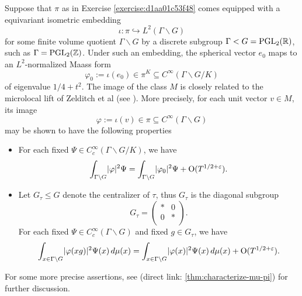 \documentclass[reqno]{amsart} 
\numberwithin{equation}{section}
\begin{document}
\begin{remark}
  Suppose that $\pi$ as in Exercise \ref{exercise:d1aa01c53f48} comes equipped with a equivariant isometric embedding
  \begin{equation*}
    \iota : \pi \hookrightarrow L^2(\Gamma \backslash G)
  \end{equation*}
  for some finite volume quotient $\Gamma \backslash G$ by a discrete subgroup $\Gamma < G = \operatorname{PGL}_2(\mathbb{R})$, such as $\Gamma = \operatorname{PGL}_2(\mathbb{Z})$.  Under such an embedding, the spherical vector $e_0$ maps to an $L^2$-normalized Maass form
  \begin{equation*}
    \varphi_0 := \iota (e_0) \in \pi^K \subseteq C^\infty(\Gamma \backslash G / K)
  \end{equation*}
  of eigenvalue $1/4 + t^2$.  The image of the class $M$ is closely related to the microlocal lift of Zelditch et al (see \cite{MR916129, MR1859345, MR2346281, MR2314452}).  More precisely, for each unit vector $v \in M$, its image
  \begin{equation*}
    \varphi := \iota(v) \in  \pi \subseteq C^\infty(\Gamma \backslash G)
  \end{equation*}
  may be shown to have the following properties
  \begin{itemize}
  \item For each fixed $\Psi \in C_c^\infty(\Gamma \backslash G / K)$, we have
    \begin{equation*}
      \int_{\Gamma \backslash G} \lvert \varphi  \rvert^2 \Psi
      = 
      \int_{\Gamma \backslash G} \lvert \varphi_0  \rvert^2 \Psi
      + \operatorname{O}(T^{1/2+\varepsilon}).
    \end{equation*}
  \item Let $G_\tau \leq G$ denote the centralizer of $\tau$, thus $G_\tau$ is the diagonal subgroup
    \begin{equation*}
      G_\tau =
      \begin{pmatrix}
        \ast & 0 \\
        0 & \ast \\
      \end{pmatrix}.
    \end{equation*}
    For each fixed $\Psi \in C_c^\infty(\Gamma \backslash G)$ and fixed $g \in G_\tau$, we have
    \begin{equation*}
      \int_{x \in \Gamma \backslash G}
      \lvert \varphi(x g)  \rvert^2 \Psi(x) \, d \mu(x)
      =
      \int_{x \in \Gamma \backslash G}
      \lvert \varphi(x)  \rvert^2 \Psi(x) \, d \mu(x)
      + \operatorname{O}(T^{1/2+\varepsilon}).
    \end{equation*}
  \end{itemize}
  For some more precise assertions, see \cite[\S7.1, Lemma 2]{nelson-variance-3} (direct link: \ref{thm:characterize-mu-pi}) for further discussion.
\end{remark}
\end{document}
